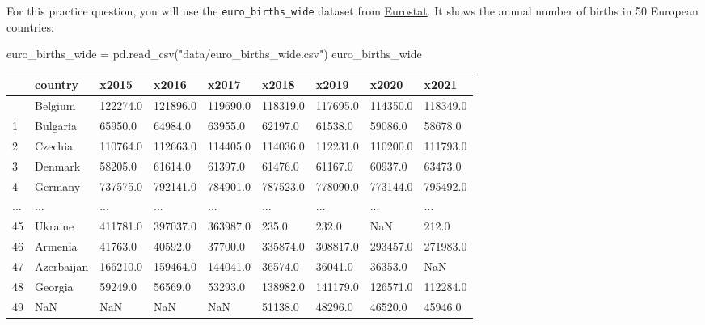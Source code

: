 \documentclass[
  letterpaper,
  DIV=11,
  numbers=noendperiod]{scrreprt}
\newenvironment{Shaded}{\begin{snugshade}}{\end{snugshade}}
\newcommand{\NormalTok}[1]{\textcolor[rgb]{0.00,0.23,0.31}{#1}}
\newcommand{\OperatorTok}[1]{\textcolor[rgb]{0.37,0.37,0.37}{#1}}
\newcommand{\StringTok}[1]{\textcolor[rgb]{0.13,0.47,0.30}{#1}}
\begin{document}
\begin{tcolorbox}[enhanced jigsaw, colframe=quarto-callout-tip-color-frame, opacityback=0, titlerule=0mm, bottomrule=.15mm, breakable, leftrule=.75mm, colbacktitle=quarto-callout-tip-color!10!white, title=\textcolor{quarto-callout-tip-color}{\faLightbulb}\hspace{0.5em}{Practice}, rightrule=.15mm, coltitle=black, opacitybacktitle=0.6, colback=white, left=2mm, arc=.35mm, toptitle=1mm, bottomtitle=1mm, toprule=.15mm]

For this practice question, you will use the \texttt{euro\_births\_wide}
dataset from
\href{https://ec.europa.eu/eurostat/databrowser/view/tps00204/default/table}{Eurostat}.
It shows the annual number of births in 50 European countries:

\begin{Shaded}
\begin{Highlighting}[]
\NormalTok{euro\_births\_wide }\OperatorTok{=}\NormalTok{ pd.read\_csv(}\StringTok{"data/euro\_births\_wide.csv"}\NormalTok{)}
\NormalTok{euro\_births\_wide}
\end{Highlighting}
\end{Shaded}

\begin{longtable}[]{@{}lllllllll@{}}
\toprule\noalign{}
& country & x2015 & x2016 & x2017 & x2018 & x2019 & x2020 & x2021 \\
\midrule\noalign{}
\endhead
\bottomrule\noalign{}
\endlastfoot
0 & Belgium & 122274.0 & 121896.0 & 119690.0 & 118319.0 & 117695.0 &
114350.0 & 118349.0 \\
1 & Bulgaria & 65950.0 & 64984.0 & 63955.0 & 62197.0 & 61538.0 & 59086.0
& 58678.0 \\
2 & Czechia & 110764.0 & 112663.0 & 114405.0 & 114036.0 & 112231.0 &
110200.0 & 111793.0 \\
3 & Denmark & 58205.0 & 61614.0 & 61397.0 & 61476.0 & 61167.0 & 60937.0
& 63473.0 \\
4 & Germany & 737575.0 & 792141.0 & 784901.0 & 787523.0 & 778090.0 &
773144.0 & 795492.0 \\
... & ... & ... & ... & ... & ... & ... & ... & ... \\
45 & Ukraine & 411781.0 & 397037.0 & 363987.0 & 235.0 & 232.0 & NaN &
212.0 \\
46 & Armenia & 41763.0 & 40592.0 & 37700.0 & 335874.0 & 308817.0 &
293457.0 & 271983.0 \\
47 & Azerbaijan & 166210.0 & 159464.0 & 144041.0 & 36574.0 & 36041.0 &
36353.0 & NaN \\
48 & Georgia & 59249.0 & 56569.0 & 53293.0 & 138982.0 & 141179.0 &
126571.0 & 112284.0 \\
49 & NaN & NaN & NaN & NaN & 51138.0 & 48296.0 & 46520.0 & 45946.0 \\
\end{longtable}


\end{tcolorbox}
\end{document}
